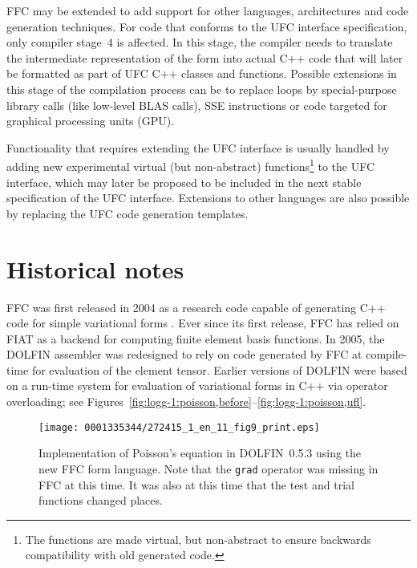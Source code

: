 FFC may be extended to add support for other languages, architectures
and code generation techniques. For code that conforms to the UFC
interface specification, only compiler stage~4 is affected. In this
stage, the compiler needs to translate the intermediate representation
of the form into actual C++ code that will later be formatted as part
of UFC C++ classes and functions. Possible extensions in this stage of
the compilation process can be to replace loops by special-purpose
library calls (like low-level BLAS calls), SSE instructions or code
targeted for graphical processing units (GPU).

Functionality that requires extending the UFC interface is usually
handled by adding new experimental virtual (but non-abstract)
functions\footnote{The functions are made virtual, but non-abstract to
  ensure backwards compatibility with old generated code.} to the UFC
interface, which may later be proposed to be included in the next
stable specification of the UFC interface. Extensions to other
languages are also possible by replacing the UFC code generation
templates.

\section{Historical notes}

FFC\enlargethispage{12pt} was first released in 2004 as a research code capable of generating C++ code for simple variational forms
\citep{KirbyLogg2006,KirbyLogg2007}. Ever since its first release,
FFC has relied on FIAT as a backend for computing finite element basis
functions. In 2005, the DOLFIN assembler was redesigned to rely on
code generated by FFC at compile-time for evaluation of the element
tensor. Earlier versions of DOLFIN were based on a run-time system for
evaluation of variational forms in C++ via operator overloading; see
Figures~\ref{fig:logg-1:poisson,before}--\ref{fig:logg-1:poisson,ufl}.



\begin{figure}
\bwfig
\narrowfigure
\texttt{[image: 0001335344/272415\_1\_en\_11\_fig9\_print.eps]}
\caption{Implementation of Poisson's equation in DOLFIN~0.5.3 using
  the new FFC form language. Note that the \texttt{grad} operator
  was missing in FFC at this time. It was also at this time that the
  test and trial functions changed places.}
\label{fig:logg-1:poisson,after}\vspace*{10pt}
\end{figure}


